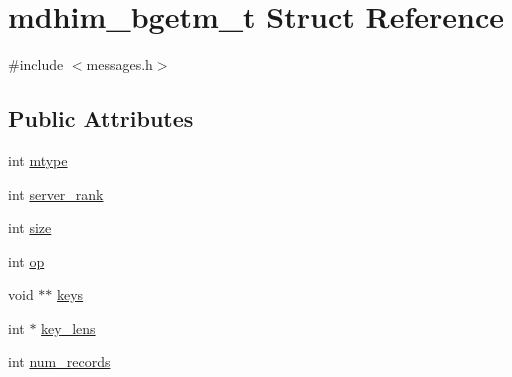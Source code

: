 \hypertarget{structmdhim__bgetm__t}{\section{mdhim\-\_\-bgetm\-\_\-t Struct Reference}
\label{structmdhim__bgetm__t}
}


{\ttfamily \#include $<$messages.\-h$>$}

\subsection*{Public Attributes}
\begin{DoxyCompactItemize}
\item 
int \hyperlink{structmdhim__bgetm__t_aa52b25716fcf7fdc26af4dd48056d976}{mtype}
\item 
int \hyperlink{structmdhim__bgetm__t_a33b8bbb7a13cf0773954c22b18cac4f4}{server\-\_\-rank}
\item 
int \hyperlink{structmdhim__bgetm__t_aa2fc1aff991240e630c426100b3ee7c0}{size}
\item 
int \hyperlink{structmdhim__bgetm__t_aa4e54e836da625bad6ebc439c5f9e047}{op}
\item 
void $\ast$$\ast$ \hyperlink{structmdhim__bgetm__t_a6abc6929954a3e7aab4b71f12b9db668}{keys}
\item 
int $\ast$ \hyperlink{structmdhim__bgetm__t_a1bda084b30e5429093159a78827efb52}{key\-\_\-lens}
\item 
int \hyperlink{structmdhim__bgetm__t_af952f7de3351ee73515c1948c5faf927}{num\-\_\-records}
\end{DoxyCompactItemize}



